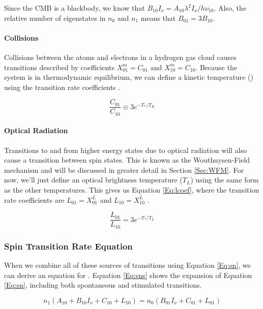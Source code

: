 Since the CMB is a blackbody, we know that $B_{10} I_{\nu} = A_{10} \lambda^2 I_{\nu}/ h \nu_{10}$. Also, the relative number of eigenstates in $n_0$ and $n_1$ means that $B_{01} = 3 B_{10}$. 


\paragraph{Collisions}

Collisions between the atoms and electrons in a hydrogen gas cloud causes transitions described by coefficients $X^m_{01} = C_{01}$ and $X^m_{10} = C_{10}$. Because the system is in thermodynamic equilibrium, we can define a kinetic temperature (\tk) using the transition rate coefficients \cite{field_1958}. 

\begin{equation}
\frac{C_{01}}{C_{10}} \equiv 3 e^{-T_*/T_K}
\end{equation}

\paragraph{Optical Radiation}

Transitions to and from higher energy states due to optical radiation will also cause a transition between spin states. This is known as the Wouthuysen-Field mechanism \cite{wouthuysen_1952}\cite{field_1958} and will be discussed in greater detail in Section \ref{Sec:WFM}. For now, we'll just define an optical brightness temperature ($T_L$) using the same form as the other temperatures. This gives us Equation \ref{Eq:lcoef}, where the transition rate coefficients are $L_{01} = X^L_{01}$ and $L_{10} = X^L_{10}$ \cite{field_1958}. 

\begin{equation} \label{Eq:lcoef}
\frac{L_{01}}{L_{10}} = 3 e^{-T_*/T_L}
\end{equation}

\subsubsection{Spin Transition Rate Equation}

When we combine all of these sources of transitions using Equation \ref{Eq:sn}, we can derive an equation for \ts. Equation \ref{Eq:sns} shows the expansion of Equation \ref{Eq:sn}, including both spontaneous and stimulated transitions. 

\begin{equation}\label{Eq:sns}
n_1(A_{10} + B_{10} I_\nu + C_{10} + L_{10}) = n_0 (B_{01} I_\nu + C_{01} + L_{01})
\end{equation}

